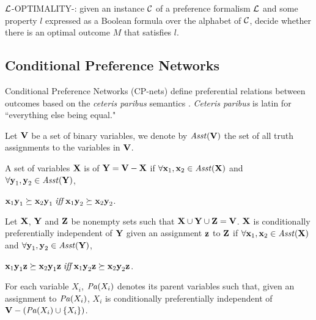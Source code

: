\begin{definition}
\label{def:opt3}
  $\mathcal{L}$-OPTIMALITY-: given an instance $\mathcal{C}$ of a preference
	formalism $\mathcal{L}$ and some property $l$ expressed as a Boolean formula 
	over the alphabet of $\mathcal{C}$,
  decide whether there is an optimal outcome $M$ that satisfies $l$.
\end{definition}



\subsection{Conditional Preference Networks}
Conditional Preference Networks (CP-nets) define preferential relations between outcomes
based on the \textit{ceteris paribus}
semantics \cite{bbdh03}.
\textit{Ceteris paribus} is latin for ``everything else being equal."

Let $\textbf{V}$ be a set of binary variables, we denote by $\mathit{Asst}(\textbf{V})$ the set of
all truth assignments to the variables in $\textbf{V}$.
\begin{definition}
\label{def:pi}
	A set of variables $\textbf{X}$ is 
	of $\textbf{Y}=\textbf{V}-\textbf{X}$ if $\forall \textbf{x}_1,\textbf{x}_2 \in \mathit{Asst}(\textbf{X})$ and
	$\forall \textbf{y}_1,\textbf{y}_2 \in \mathit{Asst}(\textbf{Y})$,
	\begin{center}
		$\textbf{x}_1\textbf{y}_1 \succeq \textbf{x}_2\textbf{y}_1 \; \textit{iff} \; \textbf{x}_1\textbf{y}_2 \succeq \textbf{x}_2\textbf{y}_2$.
	\end{center}
\end{definition}

\begin{definition}
\label{def:cpi}
	Let $\textbf{X}$, $\textbf{Y}$ and $\textbf{Z}$ be nonempty sets such that
	$\textbf{X} \cup \textbf{Y} \cup \textbf{Z} = \textbf{V}$.
	$\textbf{X}$ is conditionally preferentially independent
	of $\textbf{Y}$ given an assignment $\textbf{z}$ to $\textbf{Z}$ 
	if $\forall \textbf{x}_1,\textbf{x}_2 \in \mathit{Asst}(\textbf{X})$ and
	$\forall \textbf{y}_1,\textbf{y}_2 \in \mathit{Asst}(\textbf{Y})$,
	\begin{center}
		$\textbf{x}_1\textbf{y}_1\textbf{z} \succeq \textbf{x}_2\textbf{y}_1\textbf{z} \; \textit{iff} \; \textbf{x}_1\textbf{y}_2\textbf{z} \succeq \textbf{x}_2\textbf{y}_2\textbf{z}$.
	\end{center}
\end{definition}

\begin{definition}
	For each variable $X_i$, $\mathit{Pa}(X_i)$ denotes its parent variables such that,
	given an assignment to $\mathit{Pa}(X_i)$, $X_i$ is conditionally preferentially independent
	of $\textbf{V}-(\mathit{Pa}(X_i) \cup \{X_i\})$.
\end{definition}

